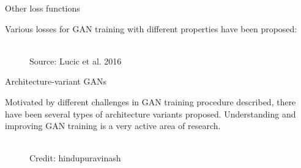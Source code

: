 \begin{frame} {Other loss functions}

Various losses for GAN training with different properties have been proposed:

  \vspace{10mm}
  \begin{figure}
    \centering
      \tiny{\\Source: Lucic et al. 2016}
  \end{figure}
\end{frame}



\begin{frame} {Architecture-variant GANs}

\vspace{2mm}
Motivated by different challenges in GAN training procedure described, there have been several types of architecture variants proposed.
\vspace{2mm}
Understanding and improving GAN training is a very active area of research.

  \begin{figure}
    \centering
      \tiny{\\Credit: hindupuravinash}
  \end{figure}
  \end{frame}
 
